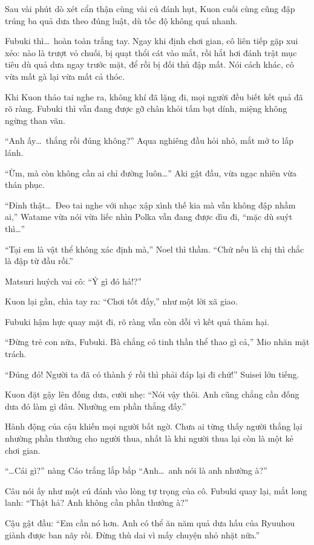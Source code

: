 \documentclass[../main.tex]{subfiles}
\begin{document}
Sau vài phút dò xét cẩn thận cùng vài cú đánh hụt, Kuon cuối cùng cũng đập trúng ba quả dưa theo đúng luật, dù tốc độ không quá nhanh.

Fubuki thì\dots\ hoàn toàn trắng tay. Ngay khi định chơi gian, cô liên tiếp gặp xui xẻo: nào là trượt vỏ chuối, bị quạt thổi cát vào mắt, rồi hắt hơi đánh trật mục tiêu dù quả dưa ngay trước mặt, để rồi bị đối thủ đập mất. Nói cách khác, cô vừa mất gà lại vừa mất cả thóc.

Khi Kuon tháo tai nghe ra, không khí đã lặng đi, mọi người đều biết kết quả đã rõ ràng. Fubuki thì vẫn đang được gỡ chân khỏi tấm bạt dính, miệng không ngừng than vãn.

``Anh ấy\dots\ thắng rồi đúng không?'' Aqua nghiêng đầu hỏi nhỏ, mắt mở to lấp lánh.

``Ừm, mà còn không cần ai chỉ đường luôn\dots'' Aki gật đầu, vừa ngạc nhiên vừa thán phục.

``Đỉnh thật\dots\ Đeo tai nghe với nhạc xập xình thế kia mà vẫn không đập nhầm ai,'' Watame vừa nói vừa liếc nhìn Polka vẫn đang được dìu đi, ``mặc dù suýt thì\dots''

``Tại em là vật thể không xác định mà,'' Noel thì thầm. ``Chứ nếu là chị thì chắc là đập từ đầu rồi.''

Matsuri huých vai cô: ``Ý gì đó hả!?''

Kuon lại gần, chìa tay ra: ``Chơi tốt đấy,'' như một lời xã giao.

Fubuki hậm hực quay mặt đi, rõ ràng vẫn còn dỗi vì kết quả thảm hại.

``Đừng trẻ con nữa, Fubuki. Bà chẳng có tinh thần thể thao gì cả,'' Mio nhăn mặt trách.

``Đúng đó! Người ta đã có thành ý rồi thì phải đáp lại đi chứ!'' Suisei lớn tiếng.

Kuon đặt gậy lên đống dưa, cười nhẹ: ``Nói vậy thôi. Anh cũng chẳng cần đống dưa đó làm gì đâu. Nhường em phần thắng đấy.''

Hành động của cậu khiến mọi người bất ngờ. Chưa ai từng thấy người thắng lại nhường phần thưởng cho người thua, nhất là khi người thua lại còn là một kẻ chơi gian.

``\dots Cái gì?'' nàng Cáo trắng lắp bắp ``Anh\dots\ anh nói là anh nhường à?''

Câu nói ấy như một cú đánh vào lòng tự trọng của cô. Fubuki quay lại, mắt long lanh: ``Thật hả? Anh không cần phần thưởng à?''

Cậu gật đầu: ``Em cần nó hơn. Anh có thể ăn năm quả dưa hấu của Ryuuhou giành được ban nãy rồi. Đừng thù dai vì mấy chuyện nhỏ nhặt nữa.''
\end{document}

